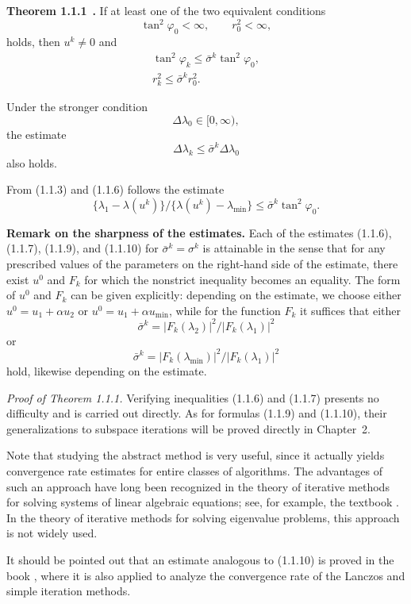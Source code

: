 \documentclass[11pt,oneside]{book}
\begin{document}
\textbf{Theorem 1.1.1}~\citep{LebedevBakhvalov1984}\textbf{.} If at least one of the two equivalent conditions
\[
\tan^2\varphi_0 < \infty, \qquad r_0^2 < \infty, \tag{1.1.5}
\]
holds, then $u^k \neq 0$ and
\begin{gather*}
\tan^2\varphi_k \leqslant \bar{\sigma}^k \tan^2\varphi_0, \tag{1.1.6} \\
r_k^2 \leqslant \bar{\sigma}^k r_0^2. \tag{1.1.7}
\end{gather*}

Under the stronger condition
\[
\Delta\lambda_0 \in [0, \infty), \tag{1.1.8}
\]
the estimate
\[
\Delta\lambda_k \leqslant \bar{\sigma}^k \Delta\lambda_0 \tag{1.1.9}
\]
also holds.

From (1.1.3) and (1.1.6) follows the estimate
\[
\{\lambda_1 - \lambda(u^k)\} / \{\lambda(u^k) - \lambda_{\min}\} \leqslant \bar{\sigma}^k \tan^2\varphi_0. \tag{1.1.10}
\]

\textbf{Remark on the sharpness of the estimates.} Each of the estimates (1.1.6), (1.1.7), (1.1.9), and (1.1.10) for $\bar{\sigma}^k = \sigma^k$ is attainable in the sense that for
any prescribed values of the parameters on the right-hand side of the estimate, there exist $u^0$ and $F_k$ for which the nonstrict inequality becomes an equality. The form of $u^0$ and $F_k$ can be given explicitly: depending on the estimate, we choose either $u^0 = u_1 + \alpha u_2$ or $u^0 = u_1 + \alpha u_{\min}$, while for the function $F_k$ it suffices that either
\[
\bar{\sigma}^k = |F_k(\lambda_2)|^2 / |F_k(\lambda_1)|^2 \tag{1.1.11}
\]
or
\[
\bar{\sigma}^k = |F_k(\lambda_{\min})|^2 / |F_k(\lambda_1)|^2 \tag{1.1.12}
\]
hold, likewise depending on the estimate.

\textit{Proof of Theorem 1.1.1.} Verifying inequalities (1.1.6) and (1.1.7) presents no difficulty and is carried out directly. As for formulas (1.1.9) and (1.1.10), their generalizations to subspace iterations will be proved directly in Chapter~2.

Note that studying the abstract method is very useful, since it actually yields convergence rate estimates for entire classes of algorithms. The advantages of such an approach have long been recognized in the theory of iterative methods for solving systems of linear algebraic equations; see, for example, the textbook \citep{SamarskiiNikolaev1978}. In the theory of iterative methods for solving eigenvalue problems, this approach is not widely used.

It should be pointed out that an estimate analogous to (1.1.10) is proved in the book \citep[p.~260]{Parlett1983}, where it is also applied to analyze the convergence rate of the Lanczos and simple iteration methods.
\end{document}
